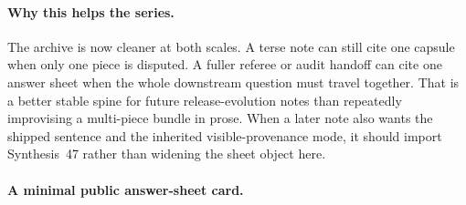 \documentclass[11pt]{article}
\begin{document}
\paragraph{Why this helps the series.}
The archive is now cleaner at both scales.
A terse note can still cite one capsule when only one piece is disputed.
A fuller referee or audit handoff can cite one answer sheet when the whole downstream question must travel together.
That is a better stable spine for future release-evolution notes than repeatedly improvising a multi-piece bundle in prose. When a later note also wants the shipped sentence and the inherited visible-provenance mode, it should import Synthesis~47 rather than widening the sheet object here.\cite{series:challengeanswercards}



\paragraph{A minimal public answer-sheet card.}
\end{document}
